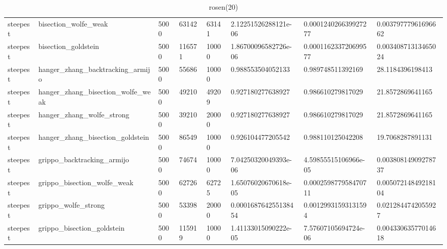 \documentclass[a4paper,11pt]{article}
\numberwithin{equation}{section} %
\begin{document}
\begin{table}[h!]
{\begin{tabular}{|l|l|l|l|l|l|l|l|}
        steepest & bisection\_wolfe\_weak & 5000 & 63142 & 63141 & 2.12251526288121e-06 & 0.000124026639927277 & 0.00379777961696662 \\
        steepest & bisection\_goldstein & 5000 & 116571 & 10000 & 1.86700096582726e-06 & 0.000116233720699577 & 0.00340871313465024 \\
        steepest & hanger\_zhang\_backtracking\_armijo & 5000 & 55686 & 10000 & 0.988553504052133 & 0.989748511392169 & 28.1184396198413 \\
        steepest & hanger\_zhang\_bisection\_wolfe\_weak & 5000 & 49210 & 49209 & 0.927180277638927 & 0.986610279817029 & 21.8572869641165 \\
        steepest & hanger\_zhang\_wolfe\_strong & 5000 & 39210 & 20000 & 0.927180277638927 & 0.986610279817029 & 21.8572869641165 \\
        steepest & hanger\_zhang\_bisection\_goldstein & 5000 & 86549 & 10000 & 0.926104477205542 & 0.988110125042208 & 19.7068287891131 \\
        steepest & grippo\_backtracking\_armijo & 5000 & 74674 & 10000 & 7.04250320049393e-06 & 4.59855515106966e-05 & 0.00380814909278737 \\
        steepest & grippo\_bisection\_wolfe\_weak & 5000 & 62726 & 62725 & 1.65076020670618e-05 & 0.000259877958470711 & 0.00507214849218104 \\
        steepest & grippo\_wolfe\_strong & 5000 & 53398 & 20000 & 0.000168764255138454 & 0.00129931593131594 & 0.0212844742055927 \\
        steepest & grippo\_bisection\_goldstein & 5000 & 115919 & 10000 & 1.41133015090222e-05 & 7.57607105694724e-06 & 0.00433063577014618 \\
\end{tabular}}
\caption{rosen(20)}
\label{table:rosen(20)}
\end{table}
\end{document}
